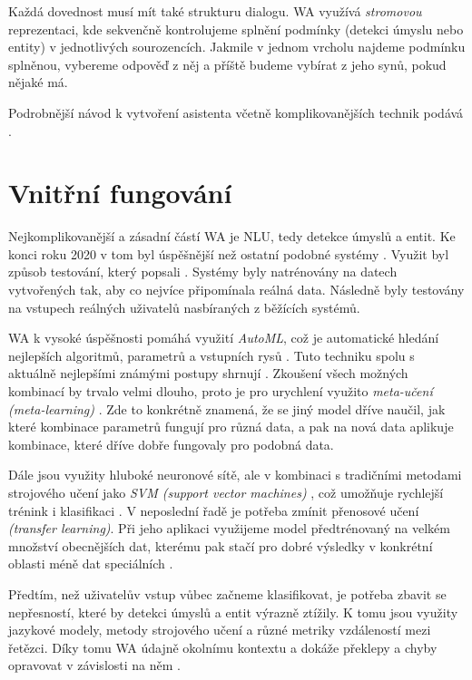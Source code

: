 Každá dovednost musí mít také strukturu dialogu.
WA využívá \textit{stromovou} reprezentaci,
kde sekvenčně kontrolujeme splnění podmínky (detekci úmyslu nebo entity) v
jednotlivých sourozencích. Jakmile v jednom vrcholu najdeme podmínku
splněnou, vybereme
odpověď z něj a příště budeme vybírat z jeho synů, pokud nějaké má.

Podrobnější návod k vytvoření asistenta včetně komplikovanějších
technik podává \citet{akbulut_common_2020}.

\section{Vnitřní fungování}\label{wa-inside}

Nejkomplikovanější a zásadní částí WA je NLU, tedy detekce úmyslů
a entit. Ke konci roku 2020 v tom byl úspěšnější než ostatní podobné
systémy \citep{qi2021benchmarking}. Využit byl způsob testování,
který popsali \citet{arora-etal-2020-hint3}. Systémy byly natrénovány
na datech vytvořených tak, aby co nejvíce připomínala reálná data.
Následně byly testovány na vstupech reálných uživatelů nasbíraných
z běžících systémů.

WA k vysoké úspěšnosti pomáhá využití \textit{AutoML}, což je
automatické hledání nejlepších algoritmů,
parametrů a vstupních rysů \citep{noauthor_watson_2020}. Tuto techniku
spolu s aktuálně nejlepšími známými postupy shrnují \citet[duben]{He_2021}.
Zkoušení všech
možných kombinací by trvalo velmi dlouho, proto je pro urychlení
využito \textit{meta-učení (meta-learning)} \citep{hospedales2020metalearning}.
Zde to konkrétně znamená, že se jiný model dříve naučil, jak které
kombinace parametrů fungují pro
různá data, a pak na nová data aplikuje kombinace, které dříve dobře
fungovaly pro podobná data.

Dále jsou využity hluboké neuronové sítě, ale v kombinaci s tradičními
metodami strojového učení jako \textit{SVM (support vector machines)}
\citep{bosertraining}, což umožňuje
rychlejší trénink i klasifikaci \citep{potdar_watson_2021}. V neposlední
řadě je potřeba zmínit přenosové učení \textit{(transfer learning)}. Při
jeho aplikaci využijeme model předtrénovaný
na velkém množství obecnějších dat, kterému pak stačí pro dobré výsledky
v konkrétní oblasti méně dat speciálních \citep{zhuang2020comprehensive}.

Předtím, než uživatelův vstup vůbec začneme klasifikovat,
je potřeba zbavit se nepřesností, které by detekci úmyslů a entit výrazně ztížily.
K tomu jsou využity jazykové modely, metody strojového učení a
různé metriky vzdáleností mezi řetězci. Díky tomu WA údajně 
okolnímu kontextu a dokáže překlepy a chyby opravovat v závislosti
na něm \citep{mason_ahnouncing_2019}.